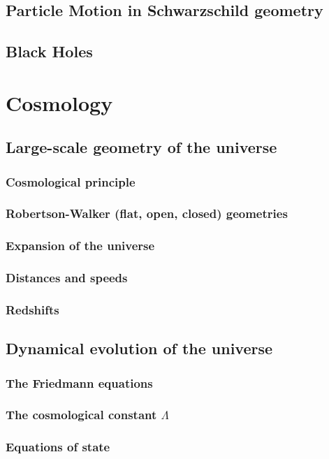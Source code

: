 \documentclass{book}
\theoremstyle{definition}
\begin{document}
\section{Particle Motion in Schwarzschild geometry}
\section{Black Holes}

\newpage

\chapter{Cosmology}
\section{Large-scale geometry of the universe}
\subsection{Cosmological principle}
\subsection{Robertson-Walker (flat, open, closed) geometries}
\subsection{Expansion of the universe}
\subsection{Distances and speeds}
\subsection{Redshifts}
\section{Dynamical evolution of the universe}
\subsection{The Friedmann equations}
\subsection{The cosmological constant $\Lambda$}
\subsection{Equations of state}
\end{document}
